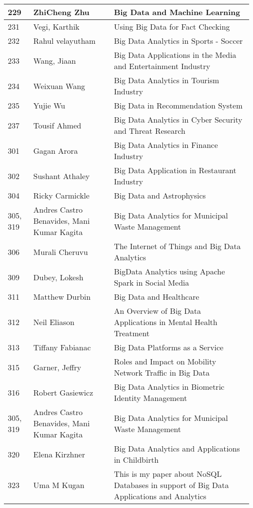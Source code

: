 \documentclass[12pt]{book}
\begin{document}
\begin{footnotesize}
\begin{longtable}{|p{1cm}p{5cm}p{9cm}|}
\hline
229 & ZhiCheng Zhu & Big Data and Machine Learning  \\
\hline
\hline
231 & Vegi, Karthik & Using Big Data for Fact Checking  \\
\hline
232 & Rahul velayutham & Big Data Analytics in Sports - Soccer  \\
\hline
233 & Wang, Jiaan & Big Data Applications in the Media and Entertainment Industry  \\
\hline
234 & Weixuan Wang & Big Data Analytics in Tourism Industry  \\
\hline
235 & Yujie Wu & Big Data in Recommendation System  \\
\hline
\hline
237 & Tousif Ahmed & Big Data Analytics in Cyber Security and Threat Research  \\
\hline
301 & Gagan Arora & Big Data Analytics in Finance Industry  \\
\hline
302 & Sushant Athaley & Big Data Application in Restaurant Industry  \\
\hline
304 & Ricky Carmickle & Big Data and Astrophysics  \\
\hline
305, 319 & Andres Castro Benavides, Mani Kumar Kagita & Big Data Analytics for Municipal Waste Management  \\
\hline
306 & Murali Cheruvu & The Internet of Things and Big Data Analytics  \\
\hline
\hline
309 & Dubey, Lokesh & BigData Analytics using Apache Spark in Social Media  \\
\hline
\hline
311 & Matthew Durbin & Big Data and Healthcare  \\
\hline
312 & Neil Eliason & An Overview of Big Data Applications in Mental Health Treatment  \\
\hline
313 & Tiffany Fabianac & Big Data Platforms as a Service  \\
\hline
\hline
315 & Garner, Jeffry & Roles and Impact on Mobility Network Traffic in Big Data  \\
\hline
316 & Robert Gasiewicz & Big Data Analytics in Biometric Identity Management  \\
\hline
\hline
305, 319 & Andres Castro Benavides, Mani Kumar Kagita & Big Data Analytics for Municipal Waste Management  \\
\hline
320 & Elena Kirzhner & Big Data Analytics and Applications in Childbirth  \\
\hline
323 & Uma M Kugan & This is my paper about NoSQL Databases in support of Big Data Applications and Analytics  \\

\end{longtable}
\end{footnotesize}
\end{document}
